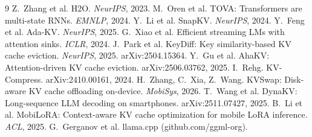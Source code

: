 \documentclass[sigconf,10pt]{acmart}
\begin{document}
\begin{thebibliography}{9}
\scriptsize\setlength{\itemsep}{-3pt}\setlength{\parskip}{0pt}
 Z.~Zhang et al. H2O. \emph{NeurIPS}, 2023.
 M.~Oren et al. TOVA: Transformers are multi-state RNNs. \emph{EMNLP}, 2024.
 Y.~Li et al. SnapKV. \emph{NeurIPS}, 2024.
 Y.~Feng et al. Ada-KV. \emph{NeurIPS}, 2025.
 G.~Xiao et al. Efficient streaming LMs with attention sinks. \emph{ICLR}, 2024.
 J.~Park et al. KeyDiff: Key similarity-based KV cache eviction. \emph{NeurIPS}, 2025. arXiv:2504.15364.
 Y.~Gu et al. AhaKV: Attention-driven KV cache eviction. arXiv:2506.03762, 2025.
 I.~Rehg. KV-Compress. arXiv:2410.00161, 2024.
 H.~Zhang, C.~Xia, Z.~Wang. KVSwap: Disk-aware KV cache offloading on-device. \emph{MobiSys}, 2026.
 T.~Wang et al. DynaKV: Long-sequence LLM decoding on smartphones. arXiv:2511.07427, 2025.
 B.~Li et al. MobiLoRA: Context-aware KV cache optimization for mobile LoRA inference. \emph{ACL}, 2025.
 G.~Gerganov et al. llama.cpp (github.com/ggml-org).
\end{thebibliography}
\end{document}
